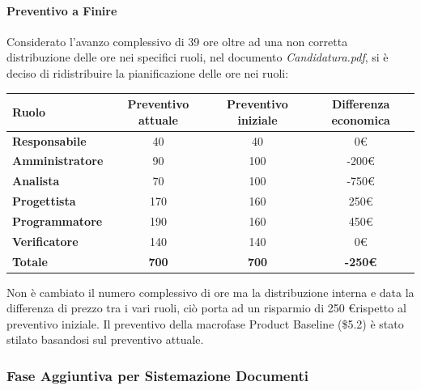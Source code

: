 \paragraph{Preventivo a Finire} \hfill \break
Considerato l'avanzo complessivo di 39 ore oltre ad una non corretta distribuzione delle ore nei specifici ruoli, nel documento \emph{Candidatura.pdf}, si è deciso di ridistribuire la pianificazione delle ore nei ruoli:
\begin{center}
	\renewcommand{\arraystretch}{1.8}
	\begin{tabular}{ | l |c|c|c| }
    \hline
    \textbf{Ruolo} & \textbf{Preventivo attuale} & \textbf{Preventivo iniziale}  & \textbf{Differenza economica}\\
	\hline
    \textbf{Responsabile} & 40 & 40 & 0\euro \\
    \hline
    \textbf{Amministratore} & 90 & 100 & -200\euro \\
    \hline
    \textbf{Analista} & 70 & 100 & -750\euro \\
    \hline
    \textbf{Progettista} & 170 & 160 & 250\euro \\
    \hline
    \textbf{Programmatore} & 190 & 160 & 450\euro \\
    \hline
    \textbf{Verificatore} & 140 & 140 & 0\euro \\
    \hline
    \textbf{Totale} & \textbf{700} & \textbf{700} & \textbf{-250\euro} \\
    \hline
    \end{tabular}
\end{center}
Non è cambiato il numero complessivo di ore ma la distribuzione interna e data la differenza di prezzo tra i vari ruoli, ciò porta ad un risparmio di 250 \euro rispetto al preventivo iniziale. \newline
Il preventivo della macrofase Product Baseline (\$5.2) è stato stilato basandosi sul preventivo attuale.

\subsubsection{Fase Aggiuntiva per Sistemazione Documenti}
